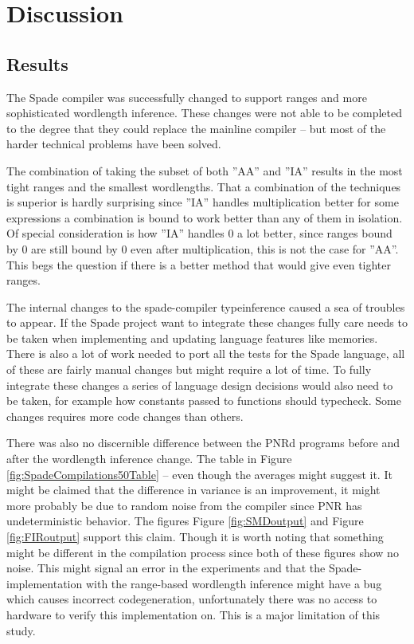 \documentclass[msc,lith,english]{liuthesis}
\begin{document}
\chapter{Discussion}
\label{cha:Discussion}

\section{Results}
The Spade compiler was successfully changed to support ranges and more sophisticated wordlength inference. These changes were not able to be completed to the degree that they could replace the mainline compiler -- but most of the harder technical problems have been solved. 

The combination of taking the subset of both ''AA'' and ''IA'' results in the most tight ranges and the smallest wordlengths. That a combination of the techniques is superior is hardly surprising since ''IA'' handles multiplication better for some expressions a combination is bound to work better than any of them in isolation. Of special consideration is how ''IA'' handles $0$ a lot better, since ranges bound by 0 are still bound by $0$ even after multiplication, this is not the case for ''AA''. This begs the question if there is a better method that would give even tighter ranges.

The internal changes to the spade-compiler typeinference caused a sea of troubles to appear. If the Spade project want to integrate these changes fully care needs to be taken when implementing and updating language features like memories. There is also a lot of work needed to port all the tests for the Spade language, all of these are fairly manual changes but might require a lot of time. To fully integrate these changes a series of language design decisions would also need to be taken, for example how constants passed to functions should typecheck. Some changes requires more code changes than others.

There was also no discernible difference between the PNRd programs before and after the wordlength inference change. The table in Figure \ref{fig:SpadeCompilations50Table} -- even though the averages might suggest it. It might be claimed that the difference in variance is an improvement, it might more probably be due to random noise from the compiler since PNR has undeterministic behavior. The figures Figure \ref{fig:SMDoutput} and Figure \ref{fig:FIRoutput} support this claim. Though it is worth noting that something might be different in the compilation process since both of these figures show no noise. This might signal an error in the experiments and that the Spade-implementation with the range-based wordlength inference might have a bug which causes incorrect codegeneration, unfortunately there was no access to hardware to verify this implementation on. This is a major limitation of this study.
\end{document}
